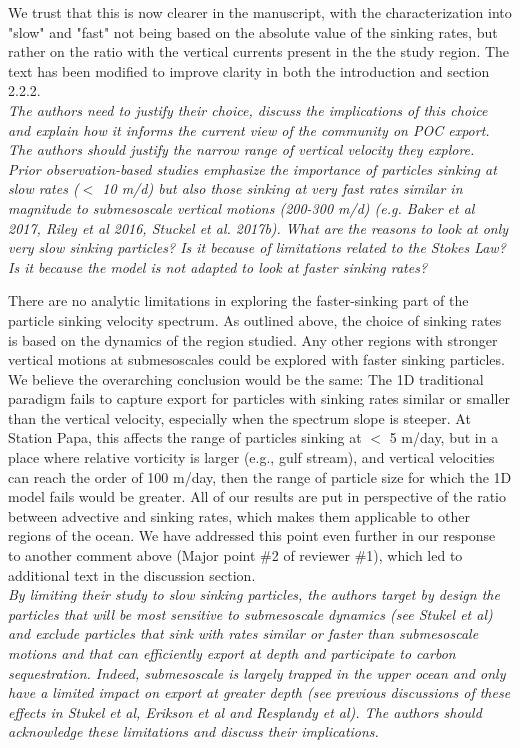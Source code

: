 \documentclass[12pt,letter]{article}
\begin{document}
We trust that this is now clearer in the manuscript, with the characterization into "slow" and "fast" not being based on the absolute value of the sinking rates, but rather on the ratio with the vertical currents present in the the study region. The text has been modified to improve clarity in both the introduction and section 2.2.2.\\
	
\textit{The authors need to justify their choice, discuss the implications of this choice and explain how it informs the current view of the community on POC export. The authors should justify the narrow range of vertical velocity they explore. Prior observation-based studies emphasize the importance of particles sinking at slow rates ($<$ 10 m/d) but also those sinking at very fast rates similar in magnitude to submesoscale vertical motions (200-300 m/d) (e.g. Baker et al 2017, Riley et al 2016, Stuckel et al. 2017b). What are the reasons to look at only very slow sinking particles? Is it because of limitations related to the Stokes Law? Is it because the model is not adapted to look at faster sinking rates?\\}

There are no analytic limitations in exploring the faster-sinking part of the particle sinking velocity spectrum. As outlined above, the choice of sinking rates is based on the dynamics of the region studied. Any other regions with stronger vertical motions at submesoscales could be explored with faster sinking particles. We believe the overarching conclusion would be the same: The 1D traditional paradigm fails to capture export for particles with sinking rates similar or smaller than the vertical velocity, especially when the spectrum slope is steeper. At Station Papa, this affects the range of particles sinking at $<$ 5 m/day, but in a place where relative vorticity is larger (e.g., gulf stream), and vertical velocities can reach the order of 100 m/day, then the range of particle size for which the 1D model fails would be greater. All of our results are put in perspective of the ratio between advective and sinking rates, which makes them applicable to other regions of the ocean. We have addressed this point even further in our response to another comment above (Major point \#2 of reviewer \#1), which led to additional text in the discussion section.\\

\textit{By limiting their study to slow sinking particles, the authors target by design the particles that will be most sensitive to submesoscale dynamics (see Stukel et al) and exclude particles that sink with rates similar or faster than submesoscale motions and that can efficiently export at depth and participate to carbon sequestration. Indeed, submesoscale is largely trapped in the upper ocean and only have a limited impact on export at greater depth (see previous discussions of these effects in Stukel et al, Erikson et al and Resplandy et al). The authors should acknowledge these limitations and discuss their implications.\\}
\end{document}

